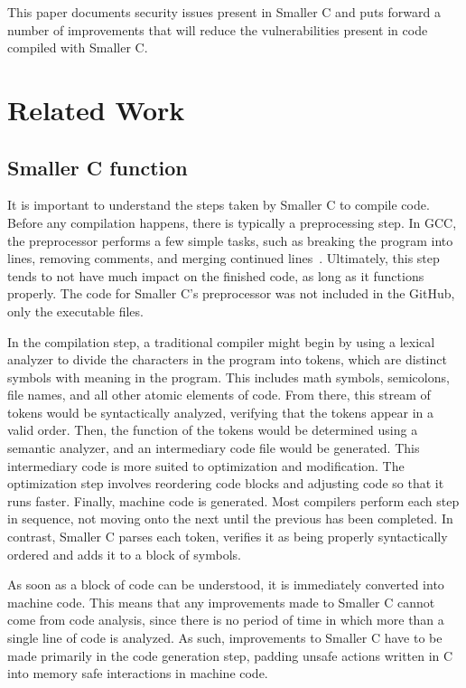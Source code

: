 \documentclass[sigconf, anonymous]{acmart}
\begin{document}
This paper documents security issues present in Smaller C and puts forward a number of improvements that will reduce the vulnerabilities present in code compiled with Smaller C.

\section{Related Work}

\subsection{Smaller C function}
It is important to understand the steps taken by Smaller C to compile code. Before any compilation happens, there is typically a preprocessing step. In GCC, the preprocessor performs a few simple tasks, such as breaking the program into lines, removing comments, and merging continued lines~\cite{GCC}. Ultimately, this step tends to not have much impact on the finished code, as long as it functions properly. The code for Smaller C’s preprocessor was not included in the GitHub, only the executable files. 

In the compilation step, a traditional compiler might begin by using a lexical analyzer to divide the characters in the program into tokens, which are distinct symbols with meaning in the program. This includes math symbols, semicolons, file names, and all other atomic elements of code. From there, this stream of tokens would be syntactically analyzed, verifying that the tokens appear in a valid order. Then, the function of the tokens would be determined using a semantic analyzer, and an intermediary code file would be generated. This intermediary code is more suited to optimization and modification. The optimization step involves reordering code blocks and adjusting code so that it runs faster. Finally, machine code is generated. Most compilers perform each step in sequence, not moving onto the next until the previous has been completed. In contrast, Smaller C parses each token, verifies it as being properly syntactically ordered and adds it to a block of symbols. 

As soon as a block of code can be understood, it is immediately converted into machine code. This means that any improvements made to Smaller C cannot come from code analysis, since there is no period of time in which more than a single line of code is analyzed. As such, improvements to Smaller C have to be made primarily in the code generation step, padding unsafe actions written in C into memory safe interactions in machine code. 
\end{document}
